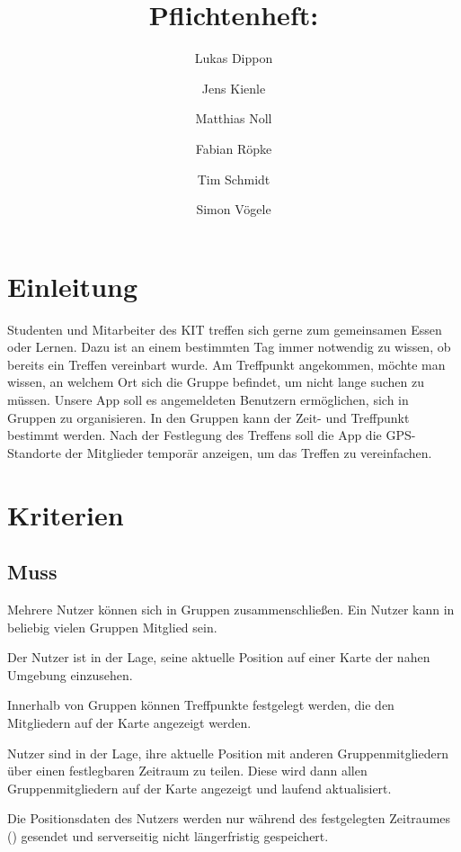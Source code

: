 \documentclass[parskip=full,11pt]{scrartcl}
\title{Pflichtenheft: \producttitle}
\author{Lukas Dippon
        \and Jens Kienle
        \and Matthias Noll
        \and Fabian Röpke
        \and Tim Schmidt
        \and Simon Vögele}
\begin{document}
\maketitle

\section{Einleitung}
Studenten und Mitarbeiter des KIT treffen sich gerne zum gemeinsamen Essen oder Lernen.
Dazu ist an einem bestimmten Tag immer notwendig zu wissen, ob bereits ein Treffen vereinbart wurde.
Am Treffpunkt angekommen, möchte man wissen, an welchem Ort sich die Gruppe befindet, um nicht lange suchen zu müssen.
Unsere App soll es angemeldeten Benutzern ermöglichen, sich in Gruppen zu organisieren.
In den Gruppen kann der Zeit- und Treffpunkt bestimmt werden.
Nach der Festlegung des Treffens soll die App die GPS-Standorte der Mitglieder temporär anzeigen, um das Treffen zu vereinfachen.

\pagebreak
\section{Kriterien}

\subsection{Muss}
Mehrere Nutzer können sich in Gruppen zusammenschließen.
Ein Nutzer kann in beliebig vielen Gruppen Mitglied sein.

Der Nutzer ist in der Lage, seine aktuelle Position auf einer Karte der nahen
Umgebung einzusehen.

Innerhalb von Gruppen können Treffpunkte festgelegt werden,
die den Mitgliedern auf der Karte angezeigt werden.

Nutzer sind in der Lage, ihre aktuelle Position mit anderen Gruppenmitgliedern
über einen festlegbaren Zeitraum zu teilen.
Diese wird dann allen Gruppenmitgliedern auf der Karte angezeigt und laufend
aktualisiert.

Die Positionsdaten des Nutzers werden nur während des festgelegten Zeitraumes
() gesendet und serverseitig nicht
längerfristig gespeichert.
\end{document}
